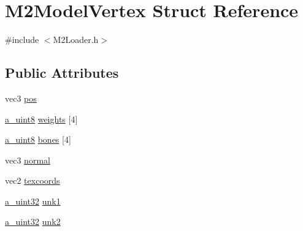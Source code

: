 \hypertarget{struct_m2_model_vertex}{\section{M2\+Model\+Vertex Struct Reference}
\label{struct_m2_model_vertex}
}


{\ttfamily \#include $<$M2\+Loader.\+h$>$}

\subsection*{Public Attributes}
\begin{DoxyCompactItemize}
\item 
vec3 \hyperlink{struct_m2_model_vertex_a76d4904ffa0f9b283abd1616959eafd4}{pos}
\item 
\hyperlink{_common_defines_8h_afbe6c09973474a1f78f870f39073398f}{a\+\_\+uint8} \hyperlink{struct_m2_model_vertex_a2bf778cfb1cfab90767c316884354d89}{weights} \mbox{[}4\mbox{]}
\item 
\hyperlink{_common_defines_8h_afbe6c09973474a1f78f870f39073398f}{a\+\_\+uint8} \hyperlink{struct_m2_model_vertex_a1d3b6f7681c9a8123148b9f9afd0550c}{bones} \mbox{[}4\mbox{]}
\item 
vec3 \hyperlink{struct_m2_model_vertex_a2c504157711a4058f726689be5e11f19}{normal}
\item 
vec2 \hyperlink{struct_m2_model_vertex_a53da447a7c914956d9eafbc65e43ec42}{texcoords}
\item 
\hyperlink{_common_defines_8h_a964296f9770051b9e4807b1f180dd416}{a\+\_\+uint32} \hyperlink{struct_m2_model_vertex_a435495b79cb0253d42c6dd55d68688c9}{unk1}
\item 
\hyperlink{_common_defines_8h_a964296f9770051b9e4807b1f180dd416}{a\+\_\+uint32} \hyperlink{struct_m2_model_vertex_ac1bf2fe4905d2e48bc1da6e852ce25cc}{unk2}
\end{DoxyCompactItemize}



